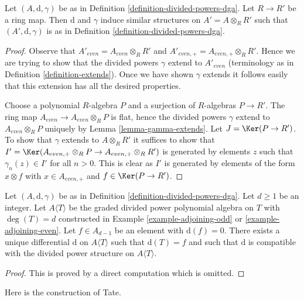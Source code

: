 \begin{lemma}
\label{lemma-base-change-div}
Let $(A, \text{d}, \gamma)$ be as in
Definition \ref{definition-divided-powers-dga}.
Let $R \to R'$ be a ring map.
Then $\text{d}$ and $\gamma$ induce similar structures on
$A' = A \otimes_R R'$ such that $(A', \text{d}, \gamma)$ is as in
Definition \ref{definition-divided-powers-dga}.
\end{lemma}

\begin{proof}
Observe that $A'_{even} = A_{even} \otimes_R R'$ and
$A'_{even, +} = A_{even, +} \otimes_R R'$. Hence we are trying to
show that the divided powers $\gamma$ extend to $A'_{even}$
(terminology as in Definition \ref{definition-extends}).
Once we have shown $\gamma$ extends it follows easily that this
extension has all the desired properties.

\medskip\noindent
Choose a polynomial $R$-algebra $P$ and a surjection of $R$-algebras
$P \to R'$. The ring map $A_{even} \to A_{even} \otimes_R P$ is flat,
hence the divided powers $\gamma$ extend to $A_{even} \otimes_R P$
uniquely by Lemma \ref{lemma-gamma-extends}.
Let $J = \Ker(P \to R')$. To show that $\gamma$ extends
to $A \otimes_R R'$ it suffices to show that
$I' = \Ker(A_{even, +} \otimes_R P \to A_{even, +} \otimes_R R')$
is generated by elements $z$ such that $\gamma_n(z) \in I'$
for all $n > 0$. This is clear as $I'$ is generated by elements
of the form $x \otimes f$ with
$x \in A_{even, +}$ and $f \in \Ker(P \to R')$.
\end{proof}

\begin{lemma}
\label{lemma-extend-differential}
Let $(A, \text{d}, \gamma)$ be as in
Definition \ref{definition-divided-powers-dga}.
Let $d \geq 1$ be an integer.
Let $A\langle T \rangle$ be the graded divided power polynomial algebra
on $T$ with $\deg(T) = d$
constructed in Example \ref{example-adjoining-odd} or
\ref{example-adjoining-even}.
Let $f \in A_{d - 1}$ be an element with $\text{d}(f) = 0$.
There exists a unique differential $\text{d}$
on $A\langle T\rangle$ such that $\text{d}(T) = f$ and
such that $\text{d}$ is compatible with the divided power
structure on $A\langle T \rangle$.
\end{lemma}

\begin{proof}
This is proved by a direct computation which is omitted.
\end{proof}

\noindent
Here is the construction of Tate.

